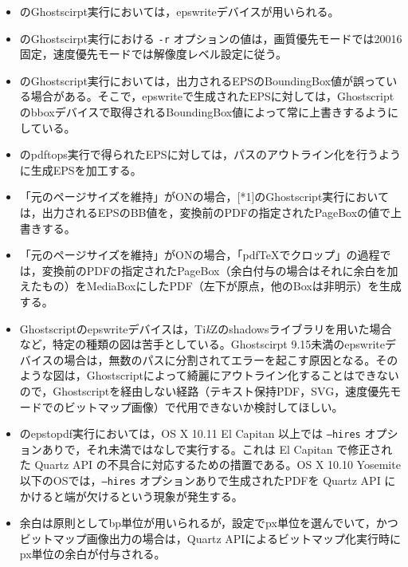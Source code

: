 \documentclass[uplatex,dvipdfmx,landscape]{jsarticle}
\newcommand*\TikZ{Ti\textit{k}Z}
\begin{document}

{\baselineskip18pt
\begin{itemize}[leftmargin=2zw]
\item\relax[*1]のGhostscirpt実行においては，epswriteデバイスが用いられる。
\item\relax[*1]のGhostscirpt実行における \texttt{-r} オプションの値は，画質優先モードでは20016固定，速度優先モードでは解像度レベル設定に従う。
\item\relax[*1]のGhostscript実行においては，出力されるEPSのBoundingBox値が誤っている場合がある。そこで，epswriteで生成されたEPSに対しては，Ghostscriptのbboxデバイスで取得されるBoundingBox値によって常に上書きするようにしている。
\item\relax[*3]のpdftops実行で得られたEPSに対しては，パスのアウトライン化を行うように生成EPSを加工する。
\item 「元のページサイズを維持」がONの場合，[*1]のGhostscript実行においては，出力されるEPSのBB値を，変換前のPDFの指定されたPageBoxの値で上書きする。
\item 「元のページサイズを維持」がONの場合，「pdf\TeX でクロップ」の過程では，変換前のPDFの指定されたPageBox（余白付与の場合はそれに余白を加えたもの）をMediaBoxにしたPDF（左下が原点，他のBoxは非明示）を生成する。
\item Ghostscriptのepswriteデバイスは，\TikZ のshadowsライブラリを用いた場合など，特定の種類の図は苦手としている。Ghostscirpt 9.15未満のepswriteデバイスの場合は，無数のパスに分割されてエラーを起こす原因となる。そのような図は，Ghostscriptによって綺麗にアウトライン化することはできないので，Ghostscriptを経由しない経路（テキスト保持PDF，SVG，速度優先モードでのビットマップ画像）で代用できないか検討してほしい。
\item\relax[*2]のepstopdf実行においては，OS X 10.11 El Capitan 以上では \texttt{--hires} オプションありで，それ未満ではなしで実行する。これは El Capitan で修正された Quartz API の不具合に対応するための措置である。OS X 10.10 Yosemite 以下のOSでは，\texttt{--hires} オプションありで生成されたPDFを Quartz API にかけると端が欠けるという現象が発生する。
\item 余白は原則としてbp単位が用いられるが，設定でpx単位を選んでいて，かつビットマップ画像出力の場合は，Quartz APIによるビットマップ化実行時にpx単位の余白が付与される。
\end{itemize}
}
\end{document}
